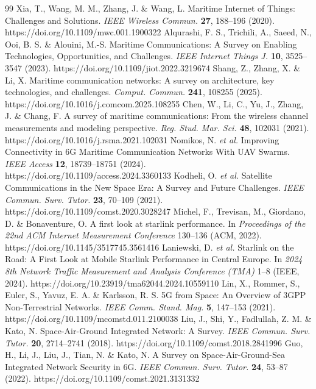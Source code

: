 \begin{thebibliography}{99}
\small
{} Xia, T., Wang, M. M., Zhang, J. \& Wang, L. Maritime Internet of Things: Challenges and Solutions. \emph{IEEE Wireless Commun.} \textbf{27}, 188--196 (2020). https://doi.org/10.1109/mwc.001.1900322
 Alqurashi, F. S., Trichili, A., Saeed, N., Ooi, B. S. \& Alouini, M.-S. Maritime Communications: A Survey on Enabling Technologies, Opportunities, and Challenges. \emph{IEEE Internet Things J.} \textbf{10}, 3525--3547 (2023). https://doi.org/10.1109/jiot.2022.3219674
 Shang, Z., Zhang, X. \& Li, X. Maritime communication networks: A survey on architecture, key technologies, and challenges. \emph{Comput. Commun.} \textbf{241}, 108255 (2025). https://doi.org/10.1016/j.comcom.2025.108255
 Chen, W., Li, C., Yu, J., Zhang, J. \& Chang, F. A survey of maritime communications: From the wireless channel measurements and modeling perspective. \emph{Reg. Stud. Mar. Sci.} \textbf{48}, 102031 (2021). https://doi.org/10.1016/j.rsma.2021.102031
 Nomikos, N. \emph{et al.} Improving Connectivity in 6G Maritime Communication Networks With UAV Swarms. \emph{IEEE Access} \textbf{12}, 18739--18751 (2024). https://doi.org/10.1109/access.2024.3360133
 Kodheli, O. \emph{et al.} Satellite Communications in the New Space Era: A Survey and Future Challenges. \emph{IEEE Commun. Surv. Tutor.} \textbf{23}, 70--109 (2021). https://doi.org/10.1109/comst.2020.3028247
 Michel, F., Trevisan, M., Giordano, D. \& Bonaventure, O. A first look at starlink performance. In \emph{Proceedings of the 22nd ACM Internet Measurement Conference} 130--136 (ACM, 2022). https://doi.org/10.1145/3517745.3561416
 Laniewski, D. \emph{et al.} Starlink on the Road: A First Look at Mobile Starlink Performance in Central Europe. In \emph{2024 8th Network Traffic Measurement and Analysis Conference (TMA)} 1--8 (IEEE, 2024). https://doi.org/10.23919/tma62044.2024.10559110
 Lin, X., Rommer, S., Euler, S., Yavuz, E. A. \& Karlsson, R. S. 5G from Space: An Overview of 3GPP Non-Terrestrial Networks. \emph{IEEE Comm. Stand. Mag.} \textbf{5}, 147--153 (2021). https://doi.org/10.1109/mcomstd.011.2100038
 Liu, J., Shi, Y., Fadlullah, Z. M. \& Kato, N. Space-Air-Ground Integrated Network: A Survey. \emph{IEEE Commun. Surv. Tutor.} \textbf{20}, 2714--2741 (2018). https://doi.org/10.1109/comst.2018.2841996
 Guo, H., Li, J., Liu, J., Tian, N. \& Kato, N. A Survey on Space-Air-Ground-Sea Integrated Network Security in 6G. \emph{IEEE Commun. Surv. Tutor.} \textbf{24}, 53--87 (2022). https://doi.org/10.1109/comst.2021.3131332

\end{thebibliography}
